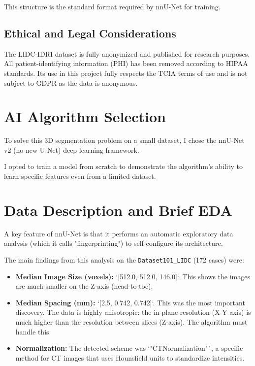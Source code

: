 \documentclass[11pt, a4paper]{article}
\begin{document}
This structure is the standard format required by nnU-Net for training.

\subsection{Ethical and Legal Considerations}

The LIDC-IDRI dataset is fully anonymized and published for research purposes. All patient-identifying information (PHI) has been removed according to HIPAA standards. Its use in this project fully respects the TCIA terms of use and is not subject to GDPR as the data is anonymous.

\section{AI Algorithm Selection}

To solve this 3D segmentation problem on a small dataset, I chose the nnU-Net v2 (no-new-U-Net) deep learning framework.

I opted to train a model from scratch to demonstrate the algorithm's ability to learn specific features even from a limited dataset.

\section{Data Description and Brief EDA}

A key feature of nnU-Net is that it performs an automatic exploratory data analysis (which it calls "fingerprinting") to self-configure its architecture.

The main findings from this analysis on the \texttt{Dataset101\_LIDC} (172 cases) were:

\begin{itemize}
    \item \textbf{Median Image Size (voxels):} `[512.0, 512.0, 146.0]`. This shows the images are much smaller on the Z-axis (head-to-toe). %
    \item \textbf{Median Spacing (mm):} `[2.5, 0.742, 0.742]`. This was the most important discovery. The data is highly anisotropic: the in-plane resolution (X-Y axis) is much higher than the resolution between slices (Z-axis). The algorithm must handle this. %
    \item \textbf{Normalization:} The detected scheme was `"CTNormalization"`, a specific method for CT images that uses Hounsfield units to standardize intensities. %
\end{itemize}
\end{document}
